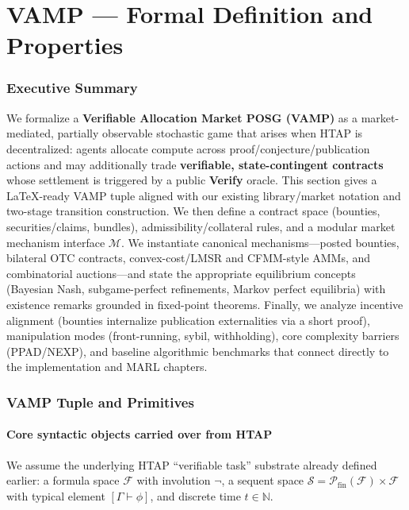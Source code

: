 \chapter{VAMP --- Formal Definition and Properties}\label{chap:vamp}

\subsection{Executive Summary}

We formalize a \textbf{Verifiable Allocation Market POSG (VAMP)} as a market-mediated, partially observable stochastic game that arises when HTAP is decentralized: agents allocate compute across proof/conjecture/publication actions and may additionally trade \textbf{verifiable, state-contingent contracts} whose settlement is triggered by a public \textbf{Verify} oracle. This section gives a LaTeX-ready VAMP tuple aligned with our existing library/market notation and two-stage transition construction. We then define a contract space (bounties, securities/claims, bundles), admissibility/collateral rules, and a modular market mechanism interface \(\mathcal{M}\). We instantiate canonical mechanisms---posted bounties, bilateral OTC contracts, convex-cost/LMSR and CFMM-style AMMs, and combinatorial auctions---and state the appropriate equilibrium concepts (Bayesian Nash, subgame-perfect refinements, Markov perfect equilibria) with existence remarks grounded in fixed-point theorems. Finally, we analyze incentive alignment (bounties internalize publication externalities via a short proof), manipulation modes (front-running, sybil, withholding), core complexity barriers (PPAD/NEXP), and baseline algorithmic benchmarks that connect directly to the implementation and MARL chapters.

\subsection{VAMP Tuple and Primitives}

\subsubsection{Core syntactic objects carried over from HTAP}

We assume the underlying HTAP ``verifiable task'' substrate already defined earlier: a formula space \(\mathcal{F}\) with involution \(\neg\), a sequent space \(\mathcal{S}=\mathcal{P}_{\mathrm{fin}}(\mathcal{F})\times\mathcal{F}\) with typical element \([\Gamma\vdash\phi]\), and discrete time \(t\in\mathbb{N}\).

